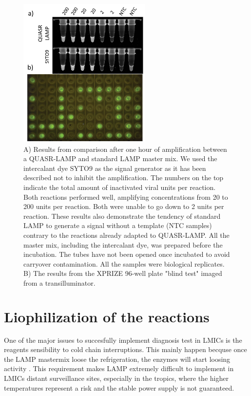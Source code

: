 \begin{figure}[b]
    \centering
    \includegraphics[width=0.59\textwidth]{figures/LAMP2.png}
    \caption[CoronaDetective qualitative results.]{ A) Results from comparison after one hour of amplification between a QUASR-LAMP and standard LAMP master mix. We used the intercalant dye SYTO9 as the signal generator as it has been described not to inhibit the amplification\cite{oscorbin_comparison_2016}. The numbers on the top indicate the total amount of inactivated viral units per reaction. Both reactions performed well, amplifying concentrations from 20 to 200 units per reaction. Both were unable to go down to 2 units per reaction. These results also demonstrate the tendency of standard LAMP to generate a signal without a template (NTC samples) contrary to the reactions already adapted to QUASR-LAMP. All the master mix, including the intercalant dye, was prepared before the incubation. The tubes have not been opened once incubated to avoid carryover contamination. All the samples were biological replicates. B) The results from the XPRIZE 96-well plate "blind test" imaged from a transilluminator.}
    \label{fig:LAMP2}
\end{figure}

\section{Liophilization of the reactions}
One of the major issues to succesfully implement diagnosis test in LMICs is the reagents sensibility to cold chain interruptions. This mainly happen becquse once the LAMP mastermix loose the refrigeration, the enzymes will start loosing activity . This requirement makes LAMP extremely difficult to implement in LMICs distant surveillance sites, especially in the tropics, where the higher temperatures represent a risk and the stable power supply is not guaranteed.

